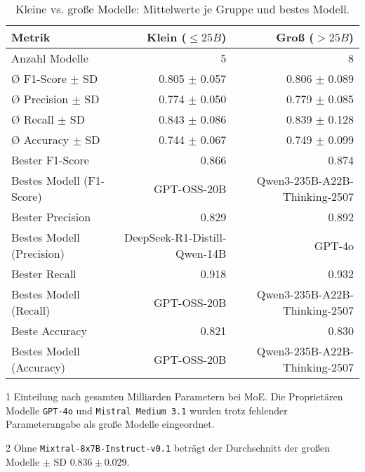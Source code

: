 \begin{table}[htbp]
 \centering
 \caption{Kleine vs. große Modelle: Mittelwerte je Gruppe und bestes Modell.}
 \label{tab:small-vs-large}
 \begin{adjustbox}{width=\textwidth}
 \begin{threeparttable}[width=\textwidth]
  \begin{tabular}[width=\textwidth]{l r r}
   \toprule
   \textbf{Metrik} & \textbf{Klein} ($\leq 25B$) & \textbf{Groß} ($> 25B$) \\
   \midrule
   Anzahl Modelle\tnote{1}             & 5                         & 8 \\
   Ø F1-Score $\pm$ SD\tnote{2}      & 0.805 $\pm$ 0.057                     & 0.806 $\pm$ 0.089 \\
   Ø Precision $\pm$ SD    & 0.774 $\pm$ 0.050                     & 0.779 $\pm$ 0.085 \\
   Ø Recall $\pm$ SD       & 0.843 $\pm$ 0.086                     & 0.839 $\pm$ 0.128 \\
   Ø Accuracy $\pm$ SD     & 0.744 $\pm$ 0.067                     & 0.749 $\pm$ 0.099 \\
   Bester F1-Score & 0.866                     & 0.874 \\
   Bestes Modell (F1-Score)   & GPT-OSS-20B               & Qwen3-235B-A22B-Thinking-2507 \\
   Bester Precision & 0.829                     & 0.892 \\
    Bestes Modell (Precision) & DeepSeek-R1-Distill-Qwen-14B        & GPT-4o \\
   Bester Recall & 0.918                     & 0.932 \\
    Bestes Modell (Recall)      & GPT-OSS-20B      & Qwen3-235B-A22B-Thinking-2507 \\
    Beste Accuracy & 0.821                     & 0.830 \\
    Bestes Modell (Accuracy)     & GPT-OSS-20B               & Qwen3-235B-A22B-Thinking-2507 \\
   \bottomrule
  \end{tabular}
  \begin{tablenotes}
   \footnotesize
   \item[1] Einteilung nach gesamten Milliarden Parametern bei \ac{MoE}. Die Proprietären Modelle \texttt{GPT-4o} und \texttt{Mistral Medium 3.1} wurden trotz fehlender Parameterangabe als große Modelle eingeordnet.
   \item[2] Ohne \texttt{Mixtral-8x7B-Instruct-v0.1} beträgt der Durchschnitt der großen Modelle $\pm$ SD $0.836 \pm 0.029$.
  \end{tablenotes}
 \end{threeparttable}
 \end{adjustbox}
\end{table}

